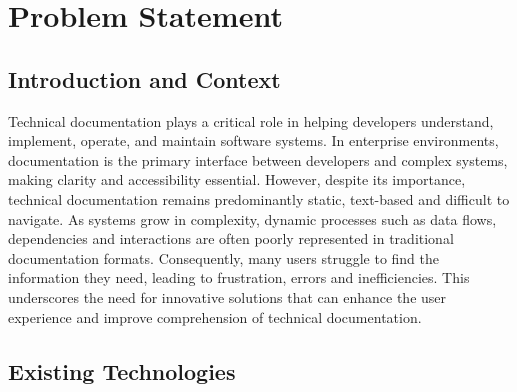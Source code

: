 \documentclass[10pt]{article}
\begin{document}
\newpage

\section{Problem Statement}

    \subsection{Introduction and Context}

    Technical documentation plays a critical role in helping developers understand, implement, operate, and maintain software systems. In enterprise environments, documentation is the primary interface between developers and complex
        systems, making clarity and accessibility essential. However, despite its importance, technical documentation remains predominantly static, text-based and difficult to navigate. As systems grow in complexity, dynamic processes such
    as data flows, dependencies and interactions are often poorly represented in traditional documentation formats. Consequently, many users struggle to find the information they need, leading to frustration, errors and inefficiencies. This 
    underscores the need for innovative solutions that can enhance the user experience and improve comprehension of technical documentation.

    \subsection{Existing Technologies}
\end{document}
